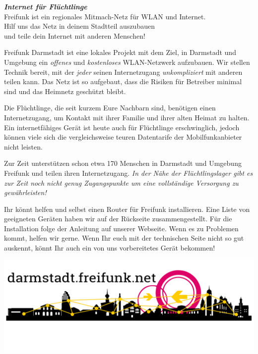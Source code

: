 \documentclass[a4paper]{article}
\begin{document}
\thispagestyle{empty}
 
\begin{center}
\Huge \textit{\textbf{\textcolor{freifunkpink}{Internet für Flüchtlinge}}} \\
\vspace{0.6cm}
\large Freifunk ist ein regionales Mitmach-Netz für WLAN und Internet.\\
Hilf uns das Netz in deinem Stadtteil auszubauen \\
und teile dein Internet mit anderen Menschen!
\normalsize

\vspace{1.0cm}
\end{center}

{ }
\vspace{0.5cm}

Freifunk Darmstadt ist eine lokales Projekt mit dem Ziel, in Darmstadt und Umgebung ein \emph{offenes} und \emph{kostenloses} WLAN-Netzwerk aufzubauen. Wir stellen Technik bereit, mit der \emph{jeder} seinen Internetzugang \emph{unkompliziert} mit anderen teilen kann. Das Netz ist so aufgebaut, dass die Risiken für Betreiber minimal sind und das Heimnetz geschützt bleibt.

Die Flüchtlinge, die seit kurzem Eure Nachbarn sind, benötigen einen Internetzugang, um Kontakt mit ihrer Familie und ihrer alten Heimat zu halten. Ein internetfähiges Gerät ist heute auch für Flüchtlinge erschwinglich, jedoch können viele sich die vergleichsweise teuren Datentarife der Mobilfunkanbieter nicht leisten.

Zur Zeit unterstützen schon etwa 170 Menschen in Darmstadt und Umgebung Freifunk und teilen ihren Internetzugang. \emph{In der Nähe der Flüchtlingslager gibt es zur Zeit noch nicht genug Zugangspunkte um eine vollständige Versorgung zu gewährleisten!}

Ihr könnt helfen und selbst einen Router für Freifunk installieren. Eine Liste von geeigneten Geräten haben wir auf der Rückseite zusammengestellt. Für die Installation folge der Anleitung auf unserer Webseite. Wenn es zu Problemen kommt, helfen wir gerne.
Wenn Ihr euch mit der technischen Seite nicht so gut auskennt, könnt Ihr auch ein von uns vorbereitetes Gerät bekommen!

\vspace{0.6cm}

\begin{center}
\includegraphics[width=\textwidth]{logo-refugees}
\end{center}
\end{document}
